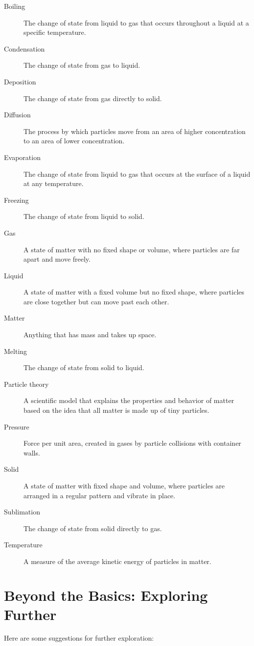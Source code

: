 \documentclass[justified,notoc]{tufte-book}
\begin{document}
\begin{description}
    \item[Boiling] The change of state from liquid to gas that occurs throughout a liquid at a specific temperature.
    \item[Condensation] The change of state from gas to liquid.
    \item[Deposition] The change of state from gas directly to solid.
    \item[Diffusion] The process by which particles move from an area of higher concentration to an area of lower concentration.
    \item[Evaporation] The change of state from liquid to gas that occurs at the surface of a liquid at any temperature.
    \item[Freezing] The change of state from liquid to solid.
    \item[Gas] A state of matter with no fixed shape or volume, where particles are far apart and move freely.
    \item[Liquid] A state of matter with a fixed volume but no fixed shape, where particles are close together but can move past each other.
    \item[Matter] Anything that has mass and takes up space.
    \item[Melting] The change of state from solid to liquid.
    \item[Particle theory] A scientific model that explains the properties and behavior of matter based on the idea that all matter is made up of tiny particles.
    \item[Pressure] Force per unit area, created in gases by particle collisions with container walls.
    \item[Solid] A state of matter with fixed shape and volume, where particles are arranged in a regular pattern and vibrate in place.
    \item[Sublimation] The change of state from solid directly to gas.
    \item[Temperature] A measure of the average kinetic energy of particles in matter.
\end{description}

\section{Beyond the Basics: Exploring Further}

 Here are some suggestions for further exploration:
\end{document}
